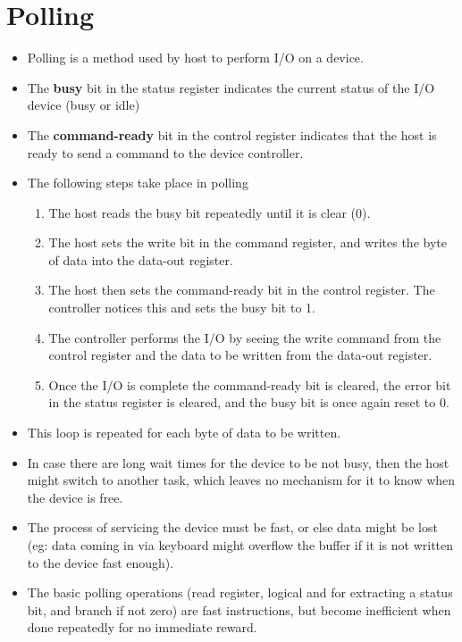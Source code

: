 \documentclass{article}
\theoremstyle{plain}
\theoremstyle{definition}
\begin{document}
\section{Polling}
\begin{itemize}
    \item Polling is a method used by host to perform I/O on a device. 
    
    \item The \textbf{busy} bit in the status register indicates the current status of the I/O device (busy or idle) 
    
    \item The \textbf{command-ready} bit in the control register indicates that the host is ready to send a command to the device controller. 
    
    \item The following steps take place in polling
    \begin{enumerate}
        \item The host reads the busy bit repeatedly until it is clear (0). 
        
        \item The host sets the write bit in the command register, and writes the byte of data into the data-out register. 
        
        \item The host then sets the command-ready bit in the control register. The controller notices this and sets the busy bit to 1. 
        
        \item The controller performs the I/O by seeing the write command from the control register and the data to be written from the data-out register. 
        
        \item Once the I/O is complete the command-ready bit is cleared, the error bit in the status register is cleared, and the busy bit is once again reset to 0. 
    \end{enumerate}
    
    \item This loop is repeated for each byte of data to be written. 
    
    \item In case there are long wait times for the device to be not busy, then the host might switch to another task, which leaves no mechanism for it to know when the device is free. 
    
    \item The process of servicing the device must be fast, or else data might be lost (eg: data coming in via keyboard might overflow the buffer if it is not written to the device fast enough). 
    
    \item The basic polling operations (read register, logical and for extracting a status bit, and branch if not zero) are fast instructions, but become inefficient when done repeatedly for no immediate reward. 
\end{itemize}
\end{document}
